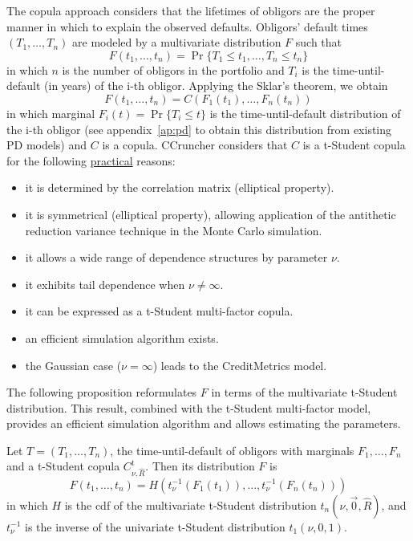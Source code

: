 \documentclass[11pt,fleqn]{book} %
\begin{document}
The copula approach considers that the lifetimes of obligors are the proper 
manner in which to explain the observed defaults. Obligors' default times 
$(T_1,\dots,T_n)$ are modeled by a multivariate distribution $F$ such that
\begin{displaymath}
	F(t_1, \dots, t_n) = \Pr \{T_1 \le t_1, \dots, T_n \le t_n\}
\end{displaymath}
in which $n$ is the number of obligors in the portfolio and $T_i$ is the 
time-until-default (in years) of the i-th obligor. Applying the Sklar's 
theorem, we obtain
\begin{displaymath}
	F(t_1, \dots, t_n) = 
	C\left(F_1(t_1), \dots, F_n(t_n)\right)
\end{displaymath}
in which marginal $F_i(t) = \Pr\{T_i \le t\}$ is the time-until-default 
distribution of the i-th obligor (see appendix~\ref{ap:pd} to obtain
this distribution from existing PD models) and $C$ is a copula. CCruncher 
considers that $C$ is a t-Student copula for the following \ul{practical} 
reasons:

\begin{itemize}
	\item it is determined by the correlation matrix (elliptical property). 
	\item it is symmetrical (elliptical property), allowing application of the 
	antithetic reduction variance technique in the Monte Carlo simulation.
	\item it allows a wide range of dependence structures by parameter $\nu$.
	\item it exhibits tail dependence when $\nu \ne \infty$.
	\item it can be expressed as a t-Student multi-factor copula.
	\item an efficient simulation algorithm exists.
	\item the Gaussian case ($\nu = \infty$) leads to the 
	CreditMetrics\texttrademark{} model.
\end{itemize}

The following proposition reformulates $F$ in terms of the multivariate 
t-Student distribution. This result, combined with the t-Student multi-factor 
model, provides an efficient simulation algorithm and allows estimating the 
parameters.

\begin{proposition}
	\label{prop:dtd}
	Let $T=(T_1,\dots,T_n)$, the time-until-default of obligors with marginals 
	$F_1, \dots, F_n$ and a t-Student copula $C_{\nu,\widehat{R}}^{\text{t}}$. 
	Then its distribution $F$ is
	\begin{displaymath}
		F(t_1,\dots,t_n) = 
		H\left(t_\nu^{-1}(F_1(t_1)), \dots, t_\nu^{-1}(F_n(t_n))\right)
	\end{displaymath}
	in which $H$ is the cdf of the multivariate t-Student distribution 
	$t_n(\nu,\vec{0},\widehat{R})$, and $t_\nu^{-1}$ is the inverse of the 
	univariate t-Student distribution $t_1(\nu,0,1)$.
\end{proposition}
\end{document}
